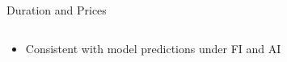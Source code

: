 \documentclass[english,xcolor=svgnames,aspectratio=169]{beamer}
\begin{document}
\begin{frame}{Duration and Prices}
\begin{minipage}{.45\textwidth}
\begin{table}
\begin{tabular}{c}
\end{tabular}
\end{table}
\end{minipage}
\begin{itemize}
\item Consistent with model predictions under FI and AI
\end{itemize}
\end{frame}


%
%

\end{document}
